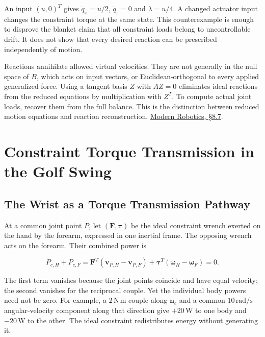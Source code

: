 \documentclass[
  11pt,
]{article}
\begin{document}
An input \((u,0)^T\) gives \(\ddot q_x=u/2\), \(\ddot q_z=0\) and
\(\lambda=u/4\). A changed actuator input changes the constraint torque
at the same state. This counterexample is enough to disprove the blanket
claim that all constraint loads belong to uncontrollable drift. It does
not show that every desired reaction can be prescribed independently of
motion.

Reactions annihilate allowed virtual velocities. They are not generally
in the null space of \(B\), which acts on input vectors, or
Euclidean-orthogonal to every applied generalized force. Using a tangent
basis \(Z\) with \(AZ=0\) eliminates ideal reactions from the reduced
equations by multiplication with \(Z^T\). To compute actual joint loads,
recover them from the full balance. This is the distinction between
reduced motion equations and reaction reconstruction.
\href{https://modernrobotics.northwestern.edu/nu-gm-book-resource/8-7-constrained-dynamics/}{Modern
Robotics, §8.7}.

\section{Constraint Torque Transmission in the Golf
Swing}\label{constraint-torque-transmission-in-the-golf-swing}

\subsection{The Wrist as a Torque Transmission
Pathway}\label{the-wrist-as-a-torque-transmission-pathway}

At a common joint point \(P\), let \((\mathbf F,\boldsymbol\tau)\) be
the ideal constraint wrench exerted on the hand by the forearm,
expressed in one inertial frame. The opposing wrench acts on the
forearm. Their combined power is

\[
P_{c,H}+P_{c,F}
=\mathbf F^T(\mathbf v_{P,H}-\mathbf v_{P,F})
+\boldsymbol\tau^T(\boldsymbol\omega_H-\boldsymbol\omega_F)=0.
\]

The first term vanishes because the joint points coincide and have equal
velocity; the second vanishes for the reciprocal couple. Yet the
individual body powers need not be zero. For example, a
\(2\,\mathrm{N\,m}\) couple along \(\mathbf n_c\) and a common
\(10\,\mathrm{rad/s}\) angular-velocity component along that direction
give \(+20\,\mathrm W\) to one body and \(-20\,\mathrm W\) to the other.
The ideal constraint redistributes energy without generating it.
\end{document}
